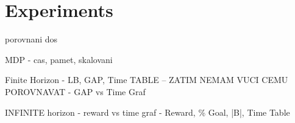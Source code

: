 

\chapter{Experiments}


porovnani dos


MDP - cas, pamet, skalovani


Finite Horizon - LB, GAP, Time TABLE -- ZATIM NEMAM VUCI CEMU POROVNAVAT
                - GAP vs Time Graf
                
INFINITE horizon - reward vs time graf
                - Reward, \% Goal, |B|, Time Table